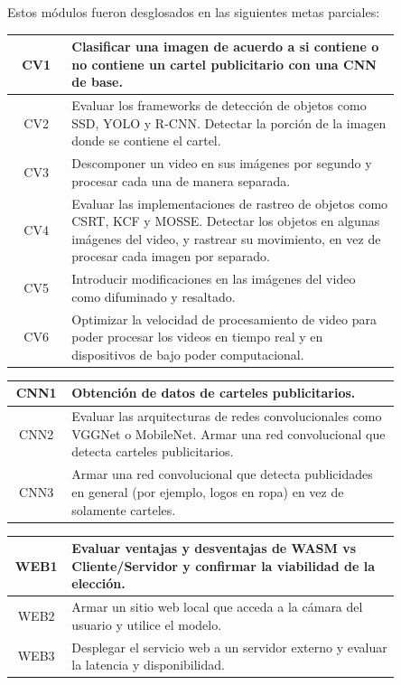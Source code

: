 \documentclass[a4paper]{article}
\begin{document}
Estos módulos fueron desglosados en las siguientes metas parciales:

\begin{center}
\begin{tabular}{c m{0.85\linewidth}} \toprule
    CV1 & Clasificar una imagen de acuerdo a si contiene o no contiene un cartel publicitario con una CNN de base. \\ \midrule
    CV2 & Evaluar los frameworks de detección de objetos como SSD, YOLO y R-CNN. \newline Detectar la porción de la imagen donde se contiene el cartel. \\ \midrule
    CV3 & Descomponer un video en sus imágenes por segundo y procesar cada una de manera separada. \\ \midrule
    CV4 & Evaluar las implementaciones de rastreo de objetos como CSRT, KCF y MOSSE. \newline Detectar los objetos en algunas imágenes del video, y rastrear su movimiento, en vez de procesar cada imagen por separado. \\ \midrule
    CV5 & Introducir modificaciones en las imágenes del video como difuminado y resaltado. \\ \midrule
    CV6 & Optimizar la velocidad de procesamiento de video para poder procesar los videos en tiempo real y en dispositivos de bajo poder computacional. \\ \bottomrule
\end{tabular}
\end{center}

\begin{center}
\begin{tabular}{c m{0.85\linewidth}} \toprule
    CNN1 & Obtención de datos de carteles publicitarios. \\ \midrule
    CNN2 & Evaluar las arquitecturas de redes convolucionales como VGGNet o MobileNet. \newline Armar una red convolucional que detecta carteles publicitarios. \\ \midrule
    CNN3 & Armar una red convolucional que detecta publicidades en general (por ejemplo, logos en ropa) en vez de solamente carteles. \\ \bottomrule
\end{tabular}
\end{center}

\begin{center}
\begin{tabular}{c m{0.85\linewidth}} \toprule
    WEB1 & Evaluar ventajas y desventajas de WASM vs Cliente/Servidor y confirmar la viabilidad de la elección. \\ \midrule
    WEB2 & Armar un sitio web local que acceda a la cámara del usuario y utilice el modelo. \\ \midrule
    WEB3 & Desplegar el servicio web a un servidor externo y evaluar la latencia y disponibilidad. \\ \bottomrule
\end{tabular}
\end{center}
\end{document}
